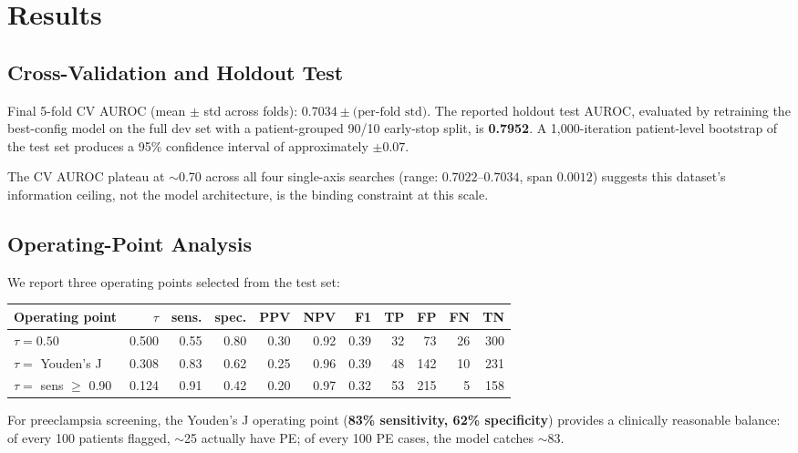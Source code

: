 \documentclass[11pt]{article}
\begin{document}
\section{Results}

\subsection{Cross-Validation and Holdout Test}

Final 5-fold CV AUROC (mean $\pm$ std across folds): $0.7034 \pm \text{(per-fold std)}$. The reported holdout test AUROC, evaluated by retraining the best-config model on the full dev set with a patient-grouped 90/10 early-stop split, is \textbf{0.7952}. A 1,000-iteration patient-level bootstrap of the test set produces a 95\% confidence interval of approximately $\pm 0.07$.

The CV AUROC plateau at $\sim$0.70 across all four single-axis searches (range: $0.7022$--$0.7034$, span $0.0012$) suggests this dataset's information ceiling, not the model architecture, is the binding constraint at this scale.

\subsection{Operating-Point Analysis}

We report three operating points selected from the test set:

\begin{center}
\begin{tabular}{lrrrrrrrrrr}
\toprule
Operating point & $\tau$ & sens. & spec. & PPV & NPV & F1 & TP & FP & FN & TN \\
\midrule
$\tau = 0.50$         & 0.500 & 0.55  & 0.80  & 0.30 & 0.92 & 0.39 & 32 & 73  & 26 & 300 \\
$\tau = $ Youden's J  & 0.308 & 0.83  & 0.62  & 0.25 & 0.96 & 0.39 & 48 & 142 & 10 & 231 \\
$\tau = $ sens $\geq$ 0.90 & 0.124 & 0.91 & 0.42 & 0.20 & 0.97 & 0.32 & 53 & 215 & 5  & 158 \\
\bottomrule
\end{tabular}
\end{center}

For preeclampsia screening, the Youden's J operating point (\textbf{83\% sensitivity, 62\% specificity}) provides a clinically reasonable balance: of every 100 patients flagged, $\sim$25 actually have PE; of every 100 PE cases, the model catches $\sim$83.
\end{document}
